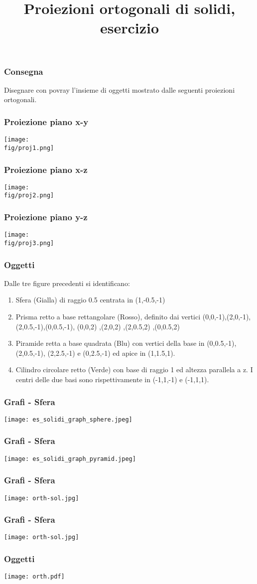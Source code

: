 \documentclass{beamer}
\title{Proiezioni ortogonali di solidi, esercizio}
\newcommand{\fig}{figures}
\begin{document}
\begin{frame}
\maketitle
\end{frame}
\begin{frame}
\frametitle{Consegna}
Disegnare con povray l'insieme di oggetti mostrato dalle seguenti proiezioni ortogonali.
\end{frame}
\begin{frame}
\frametitle{Proiezione piano x-y}
\texttt{[image: \\fig/proj1.png]}
\end{frame}
\begin{frame}
\frametitle{Proiezione piano x-z }
\texttt{[image: \\fig/proj2.png]}
\end{frame}
\begin{frame}
\frametitle{Proiezione piano y-z}
\texttt{[image: \\fig/proj3.png]}
\end{frame}
\begin{frame}
\frametitle{Oggetti}
Dalle tre figure precedenti si identificano:
\begin{enumerate}
\item Sfera (Gialla) di raggio 0.5 centrata in (1,-0.5,-1) 
\item Prisma retto a base rettangolare (Rosso), definito dai vertici 
(0,0,-1),(2,0,-1),(2,0.5,-1),(0,0.5,-1),
(0,0,2) ,(2,0,2) ,(2,0.5,2) ,(0,0.5,2)
\item Piramide retta a base quadrata (Blu) con vertici della base in (0,0.5,-1), (2,0.5,-1), (2,2.5,-1) e (0,2.5,-1) ed apice in (1,1.5,1).
\item Cilindro circolare retto (Verde) con base di raggio 1 ed altezza parallela a z. I centri delle due basi sono rispettivamente in (-1,1,-1) e (-1,1,1).
\end{enumerate}
\end{frame}
\begin{frame}
\frametitle{Grafi - Sfera}
\texttt{[image: es\_solidi\_graph\_sphere.jpeg]}
\end{frame}
\begin{frame}
\frametitle{Grafi - Sfera}
\texttt{[image: es\_solidi\_graph\_pyramid.jpeg]}
\end{frame}
\begin{frame}
\frametitle{Grafi - Sfera}
\texttt{[image: orth-sol.jpg]}
\end{frame}
\begin{frame}
\frametitle{Grafi - Sfera}
\texttt{[image: orth-sol.jpg]}
\end{frame}
\begin{frame}
\frametitle {Oggetti}
\texttt{[image: orth.pdf]}
\end{frame}
\end{document}
